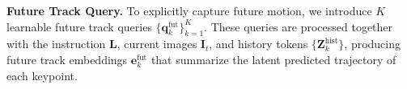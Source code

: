 \noindent \textbf{Future Track Query.}
%
%
To explicitly capture future motion, we introduce $K$ learnable future track queries $\{\mathbf{q}_k^{\text{fut}}\}_{k=1}^K$. These queries are processed together with the instruction $\mathbf{L}$, current images $\mathbf{I}_t$, and history tokens $\{\mathbf{Z}_k^{\text{hist}}\}$, producing future track embeddings $\mathbf{e}_k^{\text{fut}}$ that summarize the latent predicted trajectory of each keypoint.



